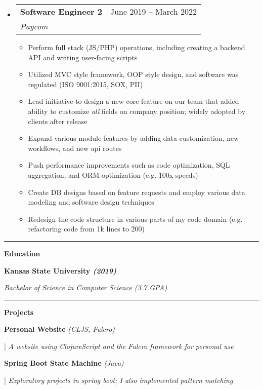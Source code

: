 \documentclass[letterpaper,11pt]{article}
\makeatletter
\newcommand{\resumeItem}[1]{
  \item\small{
    {#1 \vspace{-2pt}}
  }
}
\newcommand{\resumeSubheading}[4]{
  \vspace{-2pt}\item
    \begin{tabular*}{0.97\textwidth}[t]{l@{\extracolsep{\fill}}r}
      \textbf{#1} & #2 \\
      \textit{\small#3} & \textit{\small #4} \\
    \end{tabular*}\vspace{0pt}
}
\newcommand{\resumeSubHeadingListStart}{\begin{itemize}[leftmargin=0.15cm, label={}]}
\newcommand{\resumeSubHeadingListEnd}{\end{itemize}}
\newcommand{\resumeItemListStart}{\begin{itemize}}
\newcommand{\resumeItemListEnd}{\end{itemize}\vspace{-5pt}}
\makeatother
\begin{document}
\resumeSubHeadingListStart
\resumeSubheading
{Software Engineer 2}{June 2019 – March 2022}
{Paycom}{}
\resumeItemListStart
\resumeItem{Perform full stack (JS/PHP) operations, including creating a backend API and writing user-facing scripts}
\resumeItem{Utilized MVC style framework, OOP style design, and software was regulated (ISO 9001:2015, SOX, PII)}
\resumeItem{Lead initiative to design a new core feature on our team that added ability to customize \textit{all} fields on company position; widely adopted by clients after release }
\resumeItem{Expand various module features by adding data customization, new workflows, and new api routes}
\resumeItem{Push performance improvements such as code optimization, SQL aggregation, and ORM optimization (e.g. 100x speeds)}
\resumeItem{Create DB designs based on feature requests and employ various data modeling and software design techniques}
\resumeItem{Redesign the code structure in various parts of my code domain (e.g. refactoring code from 1k lines to 200)}
\resumeItemListEnd
\resumeSubHeadingListEnd
\noindent\rule{19.5cm}{0.4pt}

\textbf{\large \textcolor{magic_blue}{Education}}

\begin{minipage}[t]{0.45\textwidth}
  \raggedright
  \textbf{ Kansas State University \textit{(2019)}} \\
\end{minipage}
\hfill
\begin{minipage}[t]{0.45\textwidth}
  \raggedleft
  \textit{Bachelor of Science in Computer Science (3.7 GPA)} \\
\end{minipage}
\noindent\rule{19.5cm}{0.4pt}

\textbf{\large \textcolor{magic_blue}{Projects}}

\begin{minipage}[t]{0.28\textwidth}
  \raggedright
  \textbf{ Personal Website }\textit{(CLJS, Fulcro)} \\
\end{minipage}
\hfill
\begin{minipage}[t]{0.70\textwidth}
  \raggedright
  |\textit{ A website using ClojureScript and the Fulcro framework for personal use} \\
\end{minipage}

\begin{minipage}[t]{0.28\textwidth}
  \raggedright
  \textbf{ Spring Boot State Machine }\textit{(Java)} \\
\end{minipage}
\hfill
\begin{minipage}[t]{0.70\textwidth}
  \raggedright
  |\textit{ Exploratory projects in spring boot; I also implemented pattern matching } \\
\end{minipage}
\end{document}
